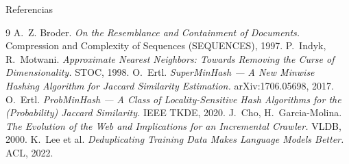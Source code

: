 \documentclass[aspectratio=169,11pt]{beamer}
\begin{document}
\begin{frame}[allowframebreaks]{Referencias}
  \footnotesize
  \begin{thebibliography}{9}
     A.~Z. Broder. \emph{On the Resemblance and Containment of
      Documents.} Compression and Complexity of Sequences (SEQUENCES), 1997.
     P.~Indyk, R.~Motwani. \emph{Approximate Nearest Neighbors:
      Towards Removing the Curse of Dimensionality.} STOC, 1998.
     O.~Ertl. \emph{SuperMinHash --- A New Minwise Hashing
      Algorithm for Jaccard Similarity Estimation.} arXiv:1706.05698, 2017.
     O.~Ertl. \emph{ProbMinHash --- A Class of
      Locality-Sensitive Hash Algorithms for the (Probability) Jaccard
      Similarity.} IEEE TKDE, 2020.
     J.~Cho, H.~Garcia-Molina. \emph{The Evolution of the Web and
      Implications for an Incremental Crawler.} VLDB, 2000.
     K.~Lee et al. \emph{Deduplicating Training Data Makes Language
      Models Better.} ACL, 2022.
  \end{thebibliography}
\end{frame}
\end{document}
